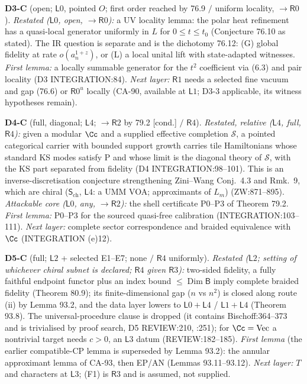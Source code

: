 \textbf{D3-C} (open; \(\mathsf L0\), pointed \(O\); first order reached by 76.9 \(/\) uniform locality, \(\to\mathsf R0\)).
\emph{Restated (\(\mathsf L0\), open, \(\to\mathsf R0\)):} a UV locality lemma: the polar heat refinement has a
quasi-local generator uniformly in \(L\) for \(0\le t\le t_0\) (Conjecture 76.10 as stated).  The IR question is
separate and is the dichotomy 76.12: (G) global fidelity at rate \(o(a_n^{1+z})\), or (L) a local unital lift with
state-adapted witnesses.  \emph{First lemma:} a locally summable generator for the \(t^2\) coefficient via (6.3) and pair
locality (D3 INTEGRATION:84).  \emph{Next layer:} \(\mathsf R1\) needs a selected fine vacuum and gap (76.6) or
\(\mathsf R0^u\) locally (CA-90, available at \(\mathsf L1\); D3-3 applicable, its witness hypotheses remain).

\textbf{D4-C} (full, diagonal; \(\mathsf L4\); \(\to\mathsf R2\) by 79.2 [cond.] \(/\) \(\mathsf R4\)).  \emph{Restated, relative
(\(\mathsf L4\), full, \(\mathsf R4\)):} given a modular \(\Cc\) and a supplied effective completion \(\mathcal S\), a
pointed categorical carrier with bounded support growth carries tile Hamiltonians whose standard KS modes satisfy P
and whose limit is the diagonal theory of \(\mathcal S\), with the KS part separated from fidelity (D4
INTEGRATION:98--101).  This is an inverse-discretisation conjecture strengthening Zini--Wang Conj.~4.3 and Rmk.~9,
which are chiral (\(\mathsf S_{\mathrm{ch}}\), \(\mathsf L4\): a UMM VOA; approximants of \(L_m\)) (ZW:871--895).
\emph{Attackable core (\(\mathsf L0\), any, \(\to\mathsf R2\)):} the shell certificate P0--P3 of Theorem 79.2.  \emph{First
lemma:} P0--P3 for the sourced quasi-free calibration (INTEGRATION:103--111).  \emph{Next layer:} complete sector
correspondence and braided equivalence with \(\Cc\) (INTEGRATION (e)12).

\textbf{D5-C} (full; \(\mathsf L2\) + selected E1--E7; none \(/\) \(\mathsf R4\) uniformly).  \emph{Restated
(\(\mathsf L2\); setting of whichever chiral subnet is declared; \(\mathsf R4\) given \(\mathsf R3\)):} two-sided fidelity,
a fully faithful endpoint functor plus an index bound \(\le\operatorname{Dim}\mathsf B\) imply complete braided
fidelity (Theorem 80.9); its finite-dimensional gap (\(n\) vs \(n^2\)) is closed along route (ii) by Lemma 93.2, and
the data layer lowers to \(\mathsf L0{+}\mathsf L4\) / \(\mathsf L1{+}\mathsf L4\) (Theorem 93.8).  The universal-procedure clause is dropped (it contains Bischoff:364--373 and is trivialised by proof search,
D5 REVIEW:210, :251); for \(\Cc=\mathrm{Vec}\) a nontrivial target needs \(c>0\), an \(\mathsf L3\) datum (REVIEW:182--185).
\emph{First lemma} (the earlier compatible-CP lemma is superseded by Lemma 93.2): the annular approximant lemma of
CA-93, then EP/AN (Lemmas 93.11--93.12).  \emph{Next layer:} \(T\) and characters at \(\mathsf L3\); (F1) is
\(\mathsf R3\) and is assumed, not supplied.

